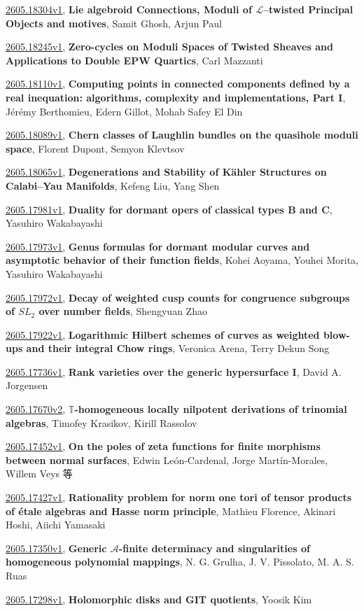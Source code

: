 \documentclass[9pt, a4paper]{article}
\theoremstyle{plain}
\theoremstyle{definition}
\theoremstyle{remark}
\newcommand{\arxiv}[3]{\href{https://arxiv.org/abs/#1}{#1}, \textbf{\textcolor{arxivblue}{#2}}, #3}
\begin{document}
\arxiv{2605.18304v1}{Lie algebroid Connections, Moduli of $\mathcal{L}$--twisted Principal Objects and motives}{Samit Ghosh, Arjun Paul}

\arxiv{2605.18245v1}{Zero-cycles on Moduli Spaces of Twisted Sheaves and Applications to Double EPW Quartics}{Carl Mazzanti}

\arxiv{2605.18110v1}{Computing points in connected components defined by a real inequation: algorithms, complexity and implementations, Part I}{Jérémy Berthomieu, Edern Gillot, Mohab Safey El Din}

\arxiv{2605.18089v1}{Chern classes of Laughlin bundles on the quasihole moduli space}{Florent Dupont, Semyon Klevtsov}

\arxiv{2605.18065v1}{Degenerations and Stability of Kähler Structures on Calabi--Yau Manifolds}{Kefeng Liu, Yang Shen}

\arxiv{2605.17981v1}{Duality for dormant opers of classical types B and C}{Yasuhiro Wakabayashi}

\arxiv{2605.17973v1}{Genus formulas for dormant modular curves and asymptotic behavior of their function fields}{Kohei Aoyama, Youhei Morita, Yasuhiro Wakabayashi}

\arxiv{2605.17972v1}{Decay of weighted cusp counts for congruence subgroups of $SL_2$ over number fields}{Shengyuan Zhao}

\arxiv{2605.17922v1}{Logarithmic Hilbert schemes of curves as weighted blow-ups and their integral Chow rings}{Veronica Arena, Terry Dekun Song}

\arxiv{2605.17736v1}{Rank varieties over the generic hypersurface I}{David A. Jorgensen}

\arxiv{2605.17670v2}{$\mathbb T$-homogeneous locally nilpotent derivations of trinomial algebras}{Timofey Krasikov, Kirill Rassolov}

\arxiv{2605.17452v1}{On the poles of zeta functions for finite morphisms between normal surfaces}{Edwin León-Cardenal, Jorge Martín-Morales, Willem Veys 等}

\arxiv{2605.17427v1}{Rationality problem for norm one tori of tensor products of étale algebras and Hasse norm principle}{Mathieu Florence, Akinari Hoshi, Aiichi Yamasaki}

\arxiv{2605.17350v1}{Generic $\mathcal{A}$-finite determinacy and singularities of homogeneous polynomial mappings}{N. G. Grulha, J. V. Pissolato, M. A. S. Ruas}

\arxiv{2605.17298v1}{Holomorphic disks and GIT quotients}{Yoosik Kim}
\end{document}
